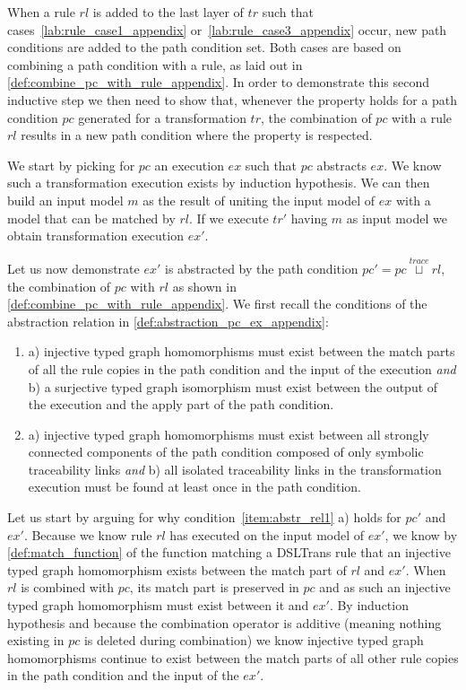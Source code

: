 \begin{pf}
\begin{itemize}
When a rule $rl$ is added to the last layer of $tr$ such that cases~\ref{lab:rule_case1_appendix} or~\ref{lab:rule_case3_appendix} occur, new path conditions are added to the path condition set. Both cases are based on combining a path condition with a rule, as laid out in \cref{def:combine_pc_with_rule_appendix}. In order to demonstrate this second inductive step we then need to show that, whenever the property holds for a path condition $pc$ generated for a transformation $tr$, the combination of $pc$ with a rule $rl$ results in a new path condition where the property is respected.

We start by picking for $pc$ an execution $ex$ such that $pc$ abstracts $ex$. We know such a transformation execution exists by induction hypothesis. We can then build an input model $m$ as the result of uniting the input model of $ex$ with a model that can be matched by $rl$. If we execute $tr'$ having $m$ as input model we obtain transformation execution $ex'$.

Let us now demonstrate $ex'$ is abstracted by the path condition $pc'=pc\stackrel{trace}{\sqcup} rl$, the combination of $pc$ with $rl$ as shown in \cref{def:combine_pc_with_rule_appendix}. We first recall the conditions of the abstraction relation in \cref{def:abstraction_pc_ex_appendix}:
\begin{enumerate}
	\item\label{item:abstr_rel1} a) injective typed graph homomorphisms must exist between the match parts of all the rule copies in the path condition and the input of the execution \emph{and} b) a surjective typed graph isomorphism must exist between the output of the execution and the apply part of the path condition.
    \item\label{item:abstr_rel2} a) injective typed graph homomorphisms must exist between all strongly connected components of the path condition composed of only symbolic traceability links \emph{and} b) all isolated traceability links in the transformation execution must be found at least once in the path condition.\vspace{.3cm}
\end{enumerate} 

Let us start by arguing for why condition~\ref{item:abstr_rel1} a) holds for $pc'$ and $ex'$. Because we know rule $rl$ has executed on the input model of $ex'$, we know by \cref{def:match_function} of the function matching a DSLTrans rule that an injective typed graph homomorphism exists between the match part of $rl$ and $ex'$. When $rl$ is combined with $pc$, its match part is preserved in $pc$ and as such an injective typed graph homomorphism must exist between it and $ex'$. By induction hypothesis and because the combination operator is additive (meaning nothing existing in $pc$ is deleted during combination) we know injective typed graph homomorphisms continue to exist between the match parts of all other rule copies in the path condition and the input of the $ex'$.\vspace{.3cm}


\end{itemize}
\end{pf}
